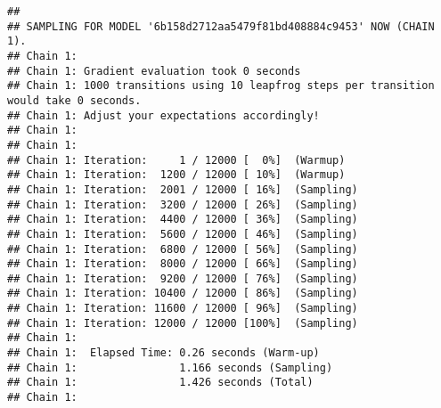 \documentclass[
]{book}
\begin{document}
\begin{verbatim}
## 
## SAMPLING FOR MODEL '6b158d2712aa5479f81bd408884c9453' NOW (CHAIN 1).
## Chain 1: 
## Chain 1: Gradient evaluation took 0 seconds
## Chain 1: 1000 transitions using 10 leapfrog steps per transition would take 0 seconds.
## Chain 1: Adjust your expectations accordingly!
## Chain 1: 
## Chain 1: 
## Chain 1: Iteration:     1 / 12000 [  0%]  (Warmup)
## Chain 1: Iteration:  1200 / 12000 [ 10%]  (Warmup)
## Chain 1: Iteration:  2001 / 12000 [ 16%]  (Sampling)
## Chain 1: Iteration:  3200 / 12000 [ 26%]  (Sampling)
## Chain 1: Iteration:  4400 / 12000 [ 36%]  (Sampling)
## Chain 1: Iteration:  5600 / 12000 [ 46%]  (Sampling)
## Chain 1: Iteration:  6800 / 12000 [ 56%]  (Sampling)
## Chain 1: Iteration:  8000 / 12000 [ 66%]  (Sampling)
## Chain 1: Iteration:  9200 / 12000 [ 76%]  (Sampling)
## Chain 1: Iteration: 10400 / 12000 [ 86%]  (Sampling)
## Chain 1: Iteration: 11600 / 12000 [ 96%]  (Sampling)
## Chain 1: Iteration: 12000 / 12000 [100%]  (Sampling)
## Chain 1: 
## Chain 1:  Elapsed Time: 0.26 seconds (Warm-up)
## Chain 1:                1.166 seconds (Sampling)
## Chain 1:                1.426 seconds (Total)
## Chain 1:
\end{verbatim}
\end{document}
